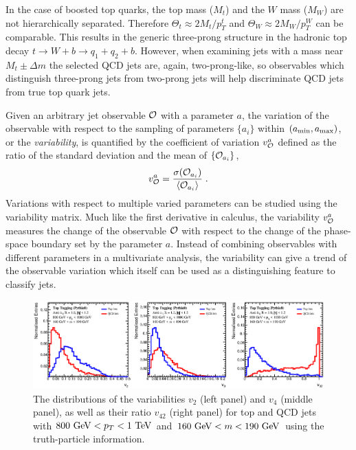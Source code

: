 \documentclass[aps,prl,floatfix,preprintnumbers,twocolumn,groupedaddress,nofootinbib]{revtex4-1}
\newcommand{\be}{\begin{equation}}
\newcommand{\ee}{\end{equation}}
\begin{document}
In the case of boosted top quarks, the top mass ($M_t$) and the $W$ mass ($M_W$) are not hierarchically separated. Therefore $\Theta_t \approx 2M_t/p_T^t$ and $\Theta_W \approx 2M_W/p_T^W$ can be comparable. This results in the generic three-prong structure in the hadronic top decay $t\rightarrow W+b \rightarrow q_1+q_2+b$. However, when examining jets with a mass near $M_t\pm \Delta m$ the selected QCD jets are, again, two-prong-like, so observables which distinguish three-prong jets from two-prong jets will help discriminate QCD jets from true top quark jets.

Given an arbitrary jet observable $\cal O$ with a parameter $a$,
the variation of the observable with respect to the sampling of parameters $\{a_i\}$ within $(a_{\rm min},a_{\rm max})$, or the {\sl variability}, is quantified by the coefficient of variation $v_{\cal O}^a$ defined as the ratio of the standard deviation and the mean of $\{{\cal O}_{a_i}\}$,
\be
    v_{\cal O}^a = \frac{\sigma({\cal O}_{a_i})}{\langle {\cal O}_{a_i}\rangle}\;.
\ee
Variations with respect to multiple varied parameters can be studied using the variability matrix. Much like the first derivative in calculus, the variability $v_{\cal O}^a$ measures the change of the observable $\cal O$ with respect to the change of the phase-space boundary set by the parameter $a$. Instead of combining observables with different parameters in a multivariate analysis, the variability can give a trend of the observable variation which itself can be used as a distinguishing feature to classify jets.

\begin{figure}
    \includegraphics[width=2\columnwidth]{plots/Top_vs_high.eps}
    \caption{The distributions of the variabilities $v_2$ (left panel) and $v_4$ (middle panel), as well as their ratio $v_{42}$ (right panel) for top and QCD jets with $800~{\rm GeV} < p_T < 1~{\rm TeV}$ and $160~{\rm GeV} < m < 190~{\rm GeV}$ using the truth-particle information.}
\label{v42}
\end{figure}
\end{document}
